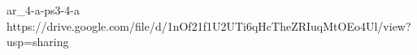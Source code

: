 ar_4-a-ps3-4-a\\
https://drive.google.com/file/d/1nOf21f1U2UTi6qHcTheZRIuqMtOEo4Ul/view?usp=sharing\\

